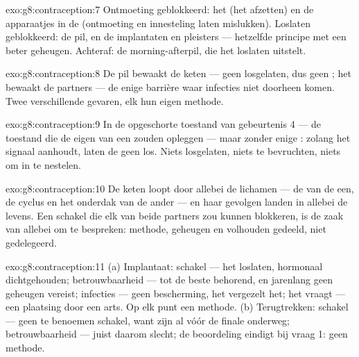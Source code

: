 \begin{solution}{exo:g8:contraception:7}
Ontmoeting geblokkeerd: het  (het afzetten) en de apparaatjes in de
 (ontmoeting en innesteling laten mislukken). Loslaten
geblokkeerd: de pil, en de implantaten en pleisters --- hetzelfde principe
met een beter geheugen. Achteraf: de morning-afterpil, die het loslaten
uitstelt.
\end{solution}

\begin{solution}{exo:g8:contraception:8}
De pil bewaakt de keten --- geen  losgelaten, dus geen ;
het  bewaakt de partners --- de enige barrière waar infecties niet
doorheen komen. Twee verschillende gevaren, elk hun eigen methode.
\end{solution}

\begin{solution}{exo:g8:contraception:9}
In de opgeschorte toestand van gebeurtenis 4 --- de toestand die de eigen
 van een  zouden opleggen --- maar zonder enige
: zolang het signaal aanhoudt, laten de  geen 
los. Niets losgelaten, niets te bevruchten, niets om in te nestelen.
\end{solution}

\begin{solution}{exo:g8:contraception:10}
De keten loopt door allebei de lichamen --- de  van de een, de
cyclus en het onderdak van de ander --- en haar gevolgen landen in allebei
de levens. Een schakel die elk van beide partners zou kunnen blokkeren, is
de zaak van allebei om te bespreken: methode, geheugen en volhouden
gedeeld, niet gedelegeerd.
\end{solution}

\begin{solution}{exo:g8:contraception:11}
(a) Implantaat: schakel --- het loslaten, hormonaal dichtgehouden;
betrouwbaarheid --- tot de beste behorend, en jarenlang geen geheugen
vereist; infecties --- geen bescherming, het  vergezelt het; het
vraagt --- een plaatsing door een arts. Op elk punt een methode. (b)
Terugtrekken: schakel --- geen te benoemen schakel, want  zijn
al vóór de finale onderweg; betrouwbaarheid --- juist daarom slecht; de
beoordeling eindigt bij vraag 1: geen methode.
\end{solution}

